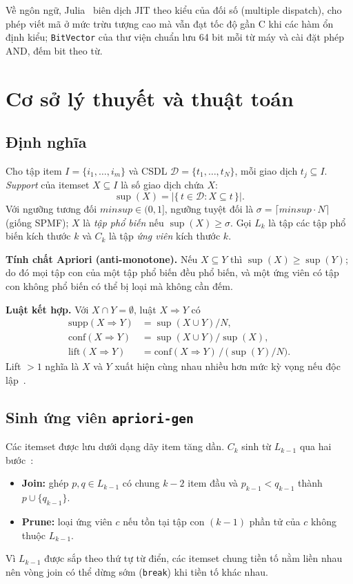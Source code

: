 \documentclass[10pt,twocolumn,letterpaper]{article}
\renewcommand{\sup}{\operatorname{sup}}
\newcommand{\D}{\mathcal{D}}
\begin{document}
Về ngôn ngữ, Julia~\cite{bezanson2017} biên dịch JIT theo kiểu của đối số (multiple dispatch), cho phép viết mã ở mức trừu tượng cao mà vẫn đạt tốc độ gần C khi các hàm ổn định kiểu; \texttt{BitVector} của thư viện chuẩn lưu 64 bit mỗi từ máy và cài đặt phép AND, đếm bit theo từ.

\section{Cơ sở lý thuyết và thuật toán}\label{sec:theory}
\subsection{Định nghĩa}
Cho tập item $I=\{i_1,\dots,i_m\}$ và CSDL $\D=\{t_1,\dots,t_N\}$, mỗi giao dịch $t_j\subseteq I$. \emph{Support} của itemset $X\subseteq I$ là số giao dịch chứa $X$:
\begin{equation}
\sup(X)=\left|\{\,t\in\D : X\subseteq t\,\}\right|.
\end{equation}
Với ngưỡng tương đối $\mathit{minsup}\in(0,1]$, ngưỡng tuyệt đối là $\sigma=\lceil \mathit{minsup}\cdot N\rceil$ (giống SPMF); $X$ là \emph{tập phổ biến} nếu $\sup(X)\ge\sigma$. Gọi $L_k$ là tập các tập phổ biến kích thước $k$ và $C_k$ là tập \emph{ứng viên} kích thước $k$.

\textbf{Tính chất Apriori (anti-monotone).} Nếu $X\subseteq Y$ thì $\sup(X)\ge\sup(Y)$; do đó mọi tập con của một tập phổ biến đều phổ biến, và một ứng viên có tập con không phổ biến có thể bị loại mà không cần đếm.

\textbf{Luật kết hợp.} Với $X\cap Y=\emptyset$, luật $X\Rightarrow Y$ có
\begin{align}
\mathrm{supp}(X\Rightarrow Y)&=\sup(X\cup Y)/N,\\
\mathrm{conf}(X\Rightarrow Y)&=\sup(X\cup Y)/\sup(X),\\
\mathrm{lift}(X\Rightarrow Y)&=\mathrm{conf}(X\Rightarrow Y)\,/\,\big(\sup(Y)/N\big).
\end{align}
Lift $>1$ nghĩa là $X$ và $Y$ xuất hiện cùng nhau nhiều hơn mức kỳ vọng nếu độc lập~\cite{brin1997}.

\subsection{Sinh ứng viên \texttt{apriori-gen}}
Các itemset được lưu dưới dạng dãy item tăng dần. $C_k$ sinh từ $L_{k-1}$ qua hai bước~\cite{agrawal1994}:
\begin{itemize}
\item \textbf{Join:} ghép $p,q\in L_{k-1}$ có chung $k-2$ item đầu và $p_{k-1}<q_{k-1}$ thành $p\cup\{q_{k-1}\}$.
\item \textbf{Prune:} loại ứng viên $c$ nếu tồn tại tập con $(k-1)$ phần tử của $c$ không thuộc $L_{k-1}$.
\end{itemize}
Vì $L_{k-1}$ được sắp theo thứ tự từ điển, các itemset chung tiền tố nằm liền nhau nên vòng join có thể dừng sớm (\texttt{break}) khi tiền tố khác nhau.
\end{document}

